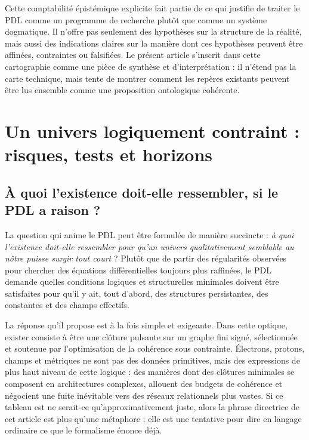 \documentclass[11pt,a4paper]{article}
\theoremstyle{definition}
\begin{document}
Cette comptabilité épistémique explicite fait partie de ce qui justifie de traiter le PDL comme un programme de recherche plutôt que comme un système dogmatique. Il n’offre pas seulement des hypothèses sur la structure de la réalité, mais aussi des indications claires sur la manière dont ces hypothèses peuvent être affinées, contraintes ou falsifiées.\cite{Laubscher_PDL_Position_2024,Laubscher_PDL_GlobalMapping_v6_2024} Le présent article s’inscrit dans cette cartographie comme une pièce de synthèse et d’interprétation : il n’étend pas la carte technique, mais tente de montrer comment les repères existants peuvent être lus ensemble comme une proposition ontologique cohérente.

\section{Un univers logiquement contraint : risques, tests et horizons}
\label{sec:risks_tests}

\subsection{À quoi l'existence doit-elle ressembler, si le PDL a raison ?}

La question qui anime le PDL peut être formulée de manière succincte : \emph{à quoi l’existence doit-elle ressembler pour qu’un univers qualitativement semblable au nôtre puisse surgir tout court} ? Plutôt que de partir des régularités observées pour chercher des équations différentielles toujours plus raffinées, le PDL demande quelles conditions logiques et structurelles minimales doivent être satisfaites pour qu’il y ait, tout d’abord, des structures persistantes, des constantes et des champs effectifs.\cite{Laubscher_EmergencePhysicalReality_2024,Laubscher_IntroPDL_2024,Laubscher_PDL_Position_2024}

La réponse qu’il propose est à la fois simple et exigeante. Dans cette optique, exister consiste à être une clôture pulsante sur un graphe fini signé, sélectionnée et soutenue par l’optimisation de la cohérence sous contrainte. Électrons, protons, champs et métriques ne sont pas des données primitives, mais des expressions de plus haut niveau de cette logique : des manières dont des clôtures minimales se composent en architectures complexes, allouent des budgets de cohérence et négocient une fuite inévitable vers des réseaux relationnels plus vastes.\cite{Laubscher_MinimalClosures_46_2024,Laubscher_ProtonArch_v2_2024,Laubscher_EffectiveFields_2024,Laubscher_UniversalCoherenceLeakage_2024} Si ce tableau est ne serait-ce qu’approximativement juste, alors la phrase directrice de cet article est plus qu’une métaphore ; elle est une tentative pour dire en langage ordinaire ce que le formalisme énonce déjà.
\end{document}
